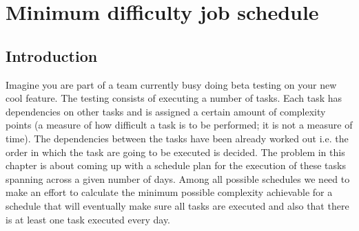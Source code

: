 %

\chapter{Minimum difficulty job schedule}
\label{ch:min_difficulty_job_scheduler}
\section*{Introduction}
Imagine you are part of a team currently busy doing beta testing on your new cool feature. The
testing consists of executing a number of tasks. Each task has dependencies on other tasks and is
assigned a certain  amount of complexity points (a measure of how difficult a task is to be
performed; it is not a measure of time). The dependencies between the tasks have been already worked
out i.e. the order in which the task are going to be executed is decided. The problem in this
chapter is about coming up with a schedule plan for the execution of these tasks spanning across a
given number of days. Among all possible schedules we need to make an effort to calculate the
minimum possible complexity achievable for a schedule that will eventually make sure all tasks are
executed and also that there is at least one task executed every day.


